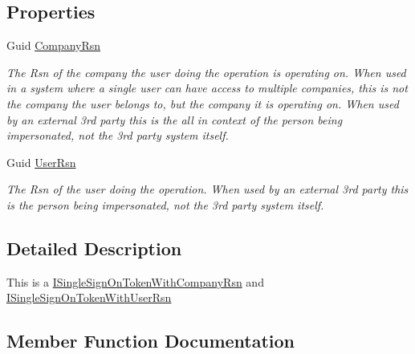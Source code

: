 \subsection*{Properties}
\begin{DoxyCompactItemize}
\item 
Guid \hyperlink{classCqrs_1_1Authentication_1_1SingleSignOnTokenWithUserRsnAndCompanyRsn_ae81ee4a4935b762a1ed2504ea321c517_ae81ee4a4935b762a1ed2504ea321c517}{Company\+Rsn}
\begin{DoxyCompactList}\small\item\em The Rsn of the company the user doing the operation is operating on. When used in a system where a single user can have access to multiple companies, this is not the company the user belongs to, but the company it is operating on. When used by an external 3rd party this is the all in context of the person being impersonated, not the 3rd party system itself. \end{DoxyCompactList}\item 
Guid \hyperlink{classCqrs_1_1Authentication_1_1SingleSignOnTokenWithUserRsnAndCompanyRsn_a4963f5699921952ac8b6439d5308090d_a4963f5699921952ac8b6439d5308090d}{User\+Rsn}
\begin{DoxyCompactList}\small\item\em The Rsn of the user doing the operation. When used by an external 3rd party this is the person being impersonated, not the 3rd party system itself. \end{DoxyCompactList}\end{DoxyCompactItemize}


\subsection{Detailed Description}
This is a \hyperlink{interfaceCqrs_1_1Authentication_1_1ISingleSignOnTokenWithCompanyRsn}{I\+Single\+Sign\+On\+Token\+With\+Company\+Rsn} and \hyperlink{interfaceCqrs_1_1Authentication_1_1ISingleSignOnTokenWithUserRsn}{I\+Single\+Sign\+On\+Token\+With\+User\+Rsn} 



\subsection{Member Function Documentation}
\mbox{\label{classCqrs_1_1Authentication_1_1SingleSignOnTokenWithUserRsnAndCompanyRsn_a8d44249c00e5264dc7b37f4868836a80_a8d44249c00e5264dc7b37f4868836a80}} 
